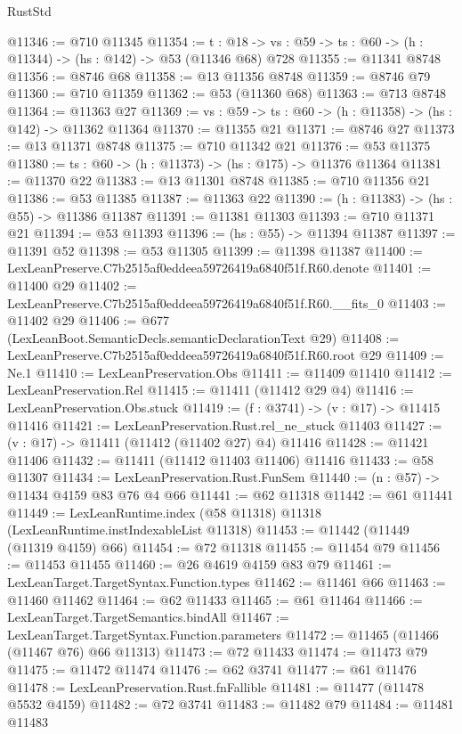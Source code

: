\begin{lexlean}{RustStd}
\begin{coremodule}
@11346 := @710 @11345
@11354 := {t : @18} ->
  {vs : @59} -> {ts : @60} -> (h : @11344) -> (hs : @142) -> @53 (@11346 @68) @728
@11355 := @11341 @8748
@11356 := @8746 @68
@11358 := @13 @11356 @8748
@11359 := @8746 @79
@11360 := @710 @11359
@11362 := @53 (@11360 @68)
@11363 := @713 @8748
@11364 := @11363 @27
@11369 := {vs : @59} -> {ts : @60} -> (h : @11358) -> (hs : @142) -> @11362 @11364
@11370 := @11355 @21
@11371 := @8746 @27
@11373 := @13 @11371 @8748
@11375 := @710 @11342 @21
@11376 := @53 @11375
@11380 := {ts : @60} -> (h : @11373) -> (hs : @175) -> @11376 @11364
@11381 := @11370 @22
@11383 := @13 @11301 @8748
@11385 := @710 @11356 @21
@11386 := @53 @11385
@11387 := @11363 @22
@11390 := (h : @11383) -> (hs : @55) -> @11386 @11387
@11391 := @11381 @11303
@11393 := @710 @11371 @21
@11394 := @53 @11393
@11396 := (hs : @55) -> @11394 @11387
@11397 := @11391 @52
@11398 := @53 @11305
@11399 := @11398 @11387
@11400 := LexLeanPreserve.C7b2515af0eddeea59726419a6840f51f.R60.denote
@11401 := @11400 @29
@11402 := LexLeanPreserve.C7b2515af0eddeea59726419a6840f51f.R60.__fits_0
@11403 := @11402 @29
@11406 := @677 (LexLeanBoot.SemanticDecls.semanticDeclarationText @29)
@11408 := LexLeanPreserve.C7b2515af0eddeea59726419a6840f51f.R60.root @29
@11409 := Ne.{1}
@11410 := LexLeanPreservation.Obs
@11411 := @11409 @11410
@11412 := LexLeanPreservation.Rel
@11415 := @11411 (@11412 @29 @4)
@11416 := LexLeanPreservation.Obs.stuck
@11419 := (f : @3741) -> (v : @17) -> @11415 @11416
@11421 := LexLeanPreservation.Rust.rel_ne_stuck @11403
@11427 := (v : @17) -> @11411 (@11412 (@11402 @27) @4) @11416
@11428 := @11421 @11406
@11432 := @11411 (@11412 @11403 @11406) @11416
@11433 := @58 @11307
@11434 := LexLeanPreservation.Rust.FunSem
@11440 := (n : @57) -> @11434 @4159 @83 @76 @4 @66
@11441 := @62 @11318
@11442 := @61 @11441
@11449 := LexLeanRuntime.index (@58 @11318) @11318 (LexLeanRuntime.instIndexableList @11318)
@11453 := @11442 (@11449 (@11319 @4159) @66)
@11454 := @72 @11318
@11455 := @11454 @79
@11456 := @11453 @11455
@11460 := @26 @4619 @4159 @83 @79
@11461 := LexLeanTarget.TargetSyntax.Function.types
@11462 := @11461 @66
@11463 := @11460 @11462
@11464 := @62 @11433
@11465 := @61 @11464
@11466 := LexLeanTarget.TargetSemantics.bindAll
@11467 := LexLeanTarget.TargetSyntax.Function.parameters
@11472 := @11465 (@11466 (@11467 @76) @66 @11313)
@11473 := @72 @11433
@11474 := @11473 @79
@11475 := @11472 @11474
@11476 := @62 @3741
@11477 := @61 @11476
@11478 := LexLeanPreservation.Rust.fnFallible
@11481 := @11477 (@11478 @5532 @4159)
@11482 := @72 @3741
@11483 := @11482 @79
@11484 := @11481 @11483

\end{coremodule}
\end{lexlean}

